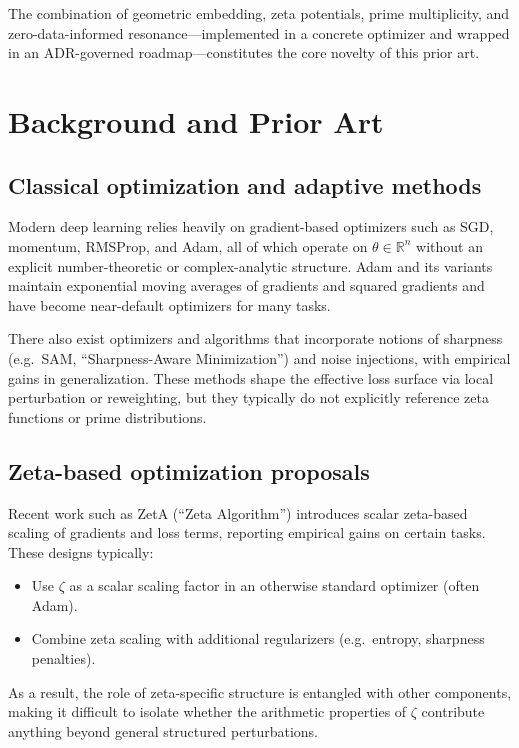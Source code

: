 \documentclass[11pt]{article}
\begin{document}
The combination of geometric embedding, zeta potentials, prime multiplicity, and zero-data-informed resonance---implemented in a concrete optimizer and wrapped in an ADR-governed roadmap---constitutes the core novelty of this prior art.

\section{Background and Prior Art}

\subsection{Classical optimization and adaptive methods}

Modern deep learning relies heavily on gradient-based optimizers such as SGD, momentum, RMSProp, and Adam, all of which operate on $\theta \in \mathbb{R}^n$ without an explicit number-theoretic or complex-analytic structure. Adam and its variants maintain exponential moving averages of gradients and squared gradients and have become near-default optimizers for many tasks.

There also exist optimizers and algorithms that incorporate notions of sharpness (e.g.\ SAM, ``Sharpness-Aware Minimization'') and noise injections, with empirical gains in generalization. These methods shape the effective loss surface via local perturbation or reweighting, but they typically do not explicitly reference zeta functions or prime distributions.

\subsection{Zeta-based optimization proposals}

Recent work such as ZetA (``Zeta Algorithm'') introduces scalar zeta-based scaling of gradients and loss terms, reporting empirical gains on certain tasks. These designs typically:
\begin{itemize}[leftmargin=*]
  \item Use $\zeta$ as a scalar scaling factor in an otherwise standard optimizer (often Adam).
  \item Combine zeta scaling with additional regularizers (e.g.\ entropy, sharpness penalties).
\end{itemize}
As a result, the role of zeta-specific structure is entangled with other components, making it difficult to isolate whether the arithmetic properties of $\zeta$ contribute anything beyond general structured perturbations.
\end{document}
